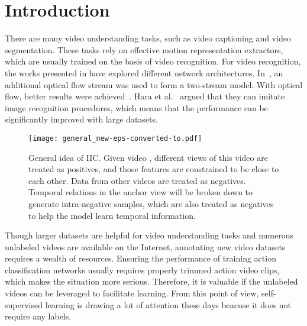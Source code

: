 \documentclass[sigconf]{acmart}
\begin{document}



\maketitle

\section{Introduction}
There are many video understanding tasks, such as video captioning and video segmentation. These tasks rely on effective motion representation extractors, which are usually trained on the basis of video recognition. For video recognition, the works presented in \cite{wang2016temporal,c3d,res3d,r3d,s3d,i3d} have explored different network architectures. In~\cite{feichtenhofer2016spatiotemporal,simonyan2014two,feichtenhofer2016convolutional}, an additional optical flow stream was used to form a two-stream model. With optical flow, better results were achieved~\cite{i3d,r3d,s3d}. 
Hara et al.~\cite{res3d} argued that they can imitate image recognition procedures, which means that the performance can be significantly improved with large datasets. 

\begin{figure}[t]
  \centering
  \texttt{[image: general\_new-eps-converted-to.pdf]}
  \caption{General idea of IIC. Given video , different views of this video are treated as positives, and those features are constrained to be close to each other. Data from other videos are treated as negatives. Temporal relations in the anchor view will be broken down to generate intra-negative samples, which are also treated as negatives to help the model learn temporal information.}
  \label{general}
\end{figure} 

Though larger datasets are helpful for video understanding tasks and numerous unlabeled videos are available on the Internet, annotating new video datasets requires a wealth of resources. Ensuring the performance of training action classification networks usually requires properly trimmed action video clips, which makes the situation more serious. Therefore, it is valuable if the unlabeled videos can be leveraged to facilitate learning. From this point of view, self-supervised learning is drawing a lot of attention these days beacuse it does not require any labels. 
\end{document}
